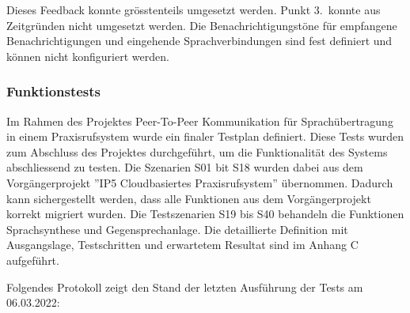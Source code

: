 Dieses Feedback konnte grösstenteils umgesetzt werden.
Punkt 3.\ konnte aus Zeitgründen nicht umgesetzt werden.
Die Benachrichtigungstöne für empfangene Benachrichtigungen und eingehende Sprachverbindungen sind fest definiert und können nicht konfiguriert werden.

\clearpage

\subsubsection{Funktionstests}

Im Rahmen des Projektes Peer-To-Peer Kommunikation für Sprachübertragung in einem Praxisrufsystem wurde ein finaler Testplan definiert.
Diese Tests wurden zum Abschluss des Projektes durchgeführt, um die Funktionalität des Systems abschliessend zu testen.
Die Szenarien S01 bit S18 wurden dabei aus dem Vorgängerprojekt ''IP5 Cloudbasiertes Praxisrufsystem'' übernommen.
Dadurch kann sichergestellt werden, dass alle Funktionen aus dem Vorgängerprojekt korrekt migriert wurden.
Die Testszenarien S19 bis S40 behandeln die Funktionen Sprachsynthese und Gegensprechanlage.
Die detaillierte Definition mit Ausgangslage, Testschritten und erwartetem Resultat sind im Anhang C aufgeführt.

Folgendes Protokoll zeigt den Stand der letzten Ausführung der Tests am 06.03.2022:


